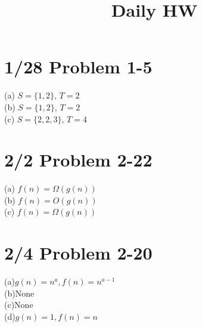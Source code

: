 \documentclass[letter]{article}
\title{Daily HW}
\date{}
\begin{document}
\maketitle
\vspace{-.5in}
\section{1/28 Problem 1-5}
(a) $S=\{1,2\}$, $T=2$\\
(b) $S=\{1,2\}$, $T=2$\\
(c) $S=\{2,2,3\}$, $T=4$\\

\section{2/2 Problem 2-22}
(a) $f(n) =\Omega(g(n))$\\
(b) $f(n) =O(g(n))$\\
(c) $f(n) =\Omega(g(n))$\\

\section{2/4 Problem 2-20}
(a)$g(n) = n^a, f(n) = n^{a-1}$\\
(b)None\\
(c)None\\
(d)$g(n)=1, f(n) = n$ 
\end{document}
